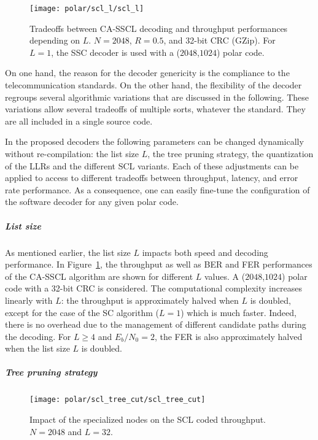 \begin{figure}
  \centering
  \texttt{[image: polar/scl\_l/scl\_l]}
  \caption{Tradeoffs between CA-SSCL decoding and throughput performances
    depending on $L$. $N=2048$, $R=0.5$, and 32-bit CRC (GZip). For $L=1$, the
    SSC decoder is used with a ($2048$,$1024$) polar code.}
  \label{plot:polar_scl_l}
\end{figure}

On one hand, the reason for the decoder genericity is the compliance to the
telecommunication standards. On the other hand, the flexibility of the decoder
regroups several algorithmic variations that are discussed in the following.
These variations allow several tradeoffs of multiple sorts, whatever the
standard. They are all included in a single source code.

In the proposed decoders the following parameters can be changed dynamically
without re-compilation: the list size $L$, the tree pruning strategy, the
quantization of the LLRs and the different SCL variants. Each of these
adjustments can be applied to access to different tradeoffs between throughput,
latency, and error rate performance. As a consequence, one can easily fine-tune
the configuration of the software decoder for any given polar code.

\subparagraph{List size}

As mentioned earlier, the list size $L$ impacts both speed and decoding
performance. In Figure~\ref{plot:polar_scl_l}, the throughput as well as BER and
FER performances of the CA-SSCL algorithm are shown for different $L$ values. A
($2048$,$1024$) polar code with a 32-bit CRC is considered. The computational
complexity increases linearly with $L$: the throughput is approximately halved
when $L$ is doubled, except for the case of the SC algorithm ($L=1$) which is
much faster. Indeed, there is no overhead due to the management of different
candidate paths during the decoding. For $L\geq4$ and $E_b/N_0=2$, the FER is
also approximately halved when the list size $L$ is doubled.

\subparagraph{Tree pruning strategy}

\begin{figure}
  \centering
  \texttt{[image: polar/scl\_tree\_cut/scl\_tree\_cut]}
  \caption{Impact of the specialized nodes on the SCL coded throughput.
    $N=2048$ and $L=32$.}
  \label{plot:polar_scl_tree_cut}
\end{figure}

